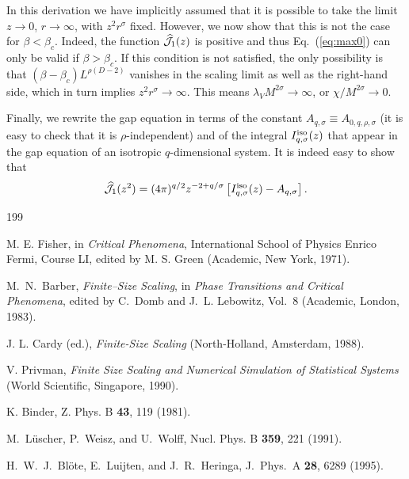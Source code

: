 \documentclass[a4paper,12pt]{article}
\begin{document}
{In this derivation we have implicitly assumed that it is possible to
take the limit $z\to 0$, $r\to \infty$, with $z^2 r^\sigma$ fixed. 
However, we now show that this is not the case for $\beta < \beta_c$. 
Indeed, the function $\widehat{\cal J}_1(z)$ is positive and 
thus Eq.~(\ref{eq:max0})
can only be valid if $\beta>\beta_c$. If this condition is not satisfied, 
the only possibility is that $(\beta - \beta_c) L^{\rho(D-2)}$ vanishes in the 
scaling limit as well as the right-hand side, which in turn implies 
$z^2 r^\sigma \to \infty$. This means $\lambda_V M^{2\sigma} \to \infty$, 
or $\chi/M^{2\sigma} \to 0$.

Finally, we rewrite the gap equation in terms of the constant
$A_{q,\sigma}\equiv A_{0,q,\rho,\sigma}$ (it is easy to check that 
it is $\rho$-independent) and of the integral $I_{q,\sigma}^{\rm iso}(z)$
that appear in the gap equation of an isotropic $q$-dimensional 
system. It is indeed easy to show that 
\begin{equation}
\widehat{\cal J}_1(z^2) = (4\pi)^{q/2} z^{-2+q/\sigma} 
   \left[I_{q,\sigma}^{\rm iso}(z) - A_{q,\sigma}\right].
\end{equation}



\begin{thebibliography}{199}

M. E. Fisher, in {\em Critical Phenomena}, International School
of Physics Enrico Fermi, Course LI, edited by M. S. Green 
(Academic, New York, 1971).

M.~N.~Barber, 
{\it Finite--Size Scaling},
 in {\em Phase Transitions and Critical Phenomena}, edited by C.~Domb
  and J.~L. Lebowitz, Vol.~8 (Academic, London, 1983). 

J. L. Cardy (ed.), {\em Finite-Size Scaling} 
(North-Holland, Amsterdam, 1988).

V. Privman, {\em Finite Size Scaling and Numerical Simulation of 
Statistical Systems} (World Scientific, Singapore, 1990).

K. Binder, Z. Phys. B {\bf 43}, 119 (1981).

M.~{L\"uscher}, P.~Weisz, and U.~Wolff,
\newblock Nucl. Phys. B {\bf {\bf 359}}, 221 (1991).
 
H.~W.~J.~Bl\"ote, E.~Luijten, and J.~R.~Heringa,
J.\ Phys.\ A {\bf 28}, 6289 (1995).
 

\end{thebibliography}}
\end{document}
